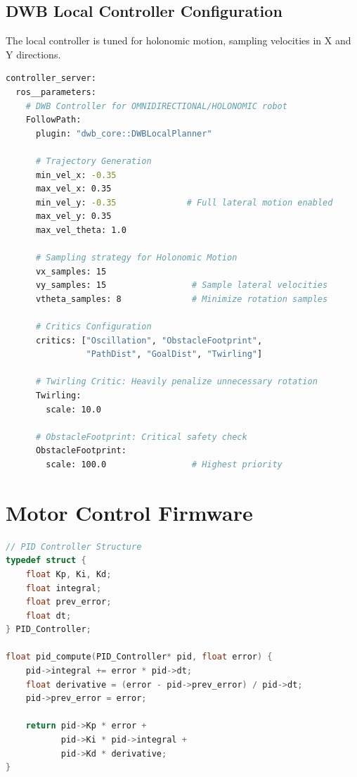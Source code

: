 \subsection{DWB Local Controller Configuration}

The local controller is tuned for holonomic motion, sampling velocities in X and Y directions.

\begin{lstlisting}[language=bash, caption={DWB Holonomic Controller Configuration}]
controller_server:
  ros__parameters:
    # DWB Controller for OMNIDIRECTIONAL/HOLONOMIC robot
    FollowPath:
      plugin: "dwb_core::DWBLocalPlanner"
      
      # Trajectory Generation
      min_vel_x: -0.35
      max_vel_x: 0.35
      min_vel_y: -0.35              # Full lateral motion enabled
      max_vel_y: 0.35
      max_vel_theta: 1.0
      
      # Sampling strategy for Holonomic Motion
      vx_samples: 15
      vy_samples: 15                 # Sample lateral velocities
      vtheta_samples: 8              # Minimize rotation samples
      
      # Critics Configuration
      critics: ["Oscillation", "ObstacleFootprint", 
                "PathDist", "GoalDist", "Twirling"]
      
      # Twirling Critic: Heavily penalize unnecessary rotation
      Twirling:
        scale: 10.0
      
      # ObstacleFootprint: Critical safety check
      ObstacleFootprint:
        scale: 100.0                 # Highest priority
\end{lstlisting}

\section{Motor Control Firmware}
\label{code:motor_control}

\begin{lstlisting}[language=C, caption={PID Motor Controller Implementation}]
// PID Controller Structure
typedef struct {
    float Kp, Ki, Kd;
    float integral;
    float prev_error;
    float dt;
} PID_Controller;

float pid_compute(PID_Controller* pid, float error) {
    pid->integral += error * pid->dt;
    float derivative = (error - pid->prev_error) / pid->dt;
    pid->prev_error = error;
    
    return pid->Kp * error + 
           pid->Ki * pid->integral + 
           pid->Kd * derivative;
}
\end{lstlisting}

